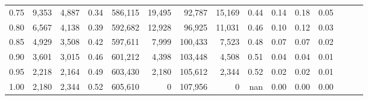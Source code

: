 \begin{tabular}{rrrrrrrrrrrrrrr}
0.75 &   9,353 &   4,887 &  0.34 &  586,115 &   19,495 &   92,787 &   15,169 &  0.44 &  0.14 &  0.18 &      0.05 \\
0.80 &   6,567 &   4,138 &  0.39 &  592,682 &   12,928 &   96,925 &   11,031 &  0.46 &  0.10 &  0.12 &      0.03 \\
0.85 &   4,929 &   3,508 &  0.42 &  597,611 &    7,999 &  100,433 &    7,523 &  0.48 &  0.07 &  0.07 &      0.02 \\
0.90 &   3,601 &   3,015 &  0.46 &  601,212 &    4,398 &  103,448 &    4,508 &  0.51 &  0.04 &  0.04 &      0.01 \\
0.95 &   2,218 &   2,164 &  0.49 &  603,430 &    2,180 &  105,612 &    2,344 &  0.52 &  0.02 &  0.02 &      0.01 \\
1.00 &   2,180 &   2,344 &  0.52 &  605,610 &        0 &  107,956 &        0 &   nan &  0.00 &  0.00 &      0.00 \\
\bottomrule
\end{tabular}
